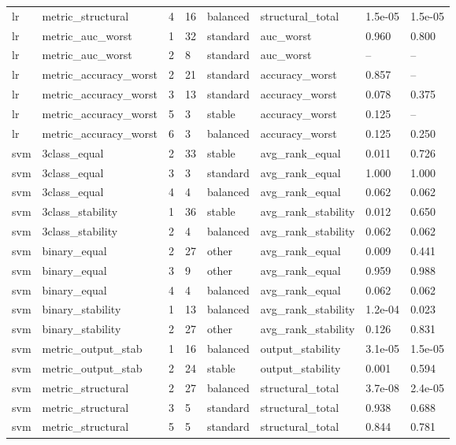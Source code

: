 \begin{table}
\begin{tabular}{llllllll}
lr & metric\_structural & 4 & 16 & balanced & structural\_total & 1.5e-05 & 1.5e-05 \\
lr & metric\_auc\_worst & 1 & 32 & standard & auc\_worst & 0.960 & 0.800 \\
lr & metric\_auc\_worst & 2 & 8 & standard & auc\_worst & -- & -- \\
lr & metric\_accuracy\_worst & 2 & 21 & standard & accuracy\_worst & 0.857 & -- \\
lr & metric\_accuracy\_worst & 3 & 13 & standard & accuracy\_worst & 0.078 & 0.375 \\
lr & metric\_accuracy\_worst & 5 & 3 & stable & accuracy\_worst & 0.125 & -- \\
lr & metric\_accuracy\_worst & 6 & 3 & balanced & accuracy\_worst & 0.125 & 0.250 \\
svm & 3class\_equal & 2 & 33 & stable & avg\_rank\_equal & 0.011 & 0.726 \\
svm & 3class\_equal & 3 & 3 & standard & avg\_rank\_equal & 1.000 & 1.000 \\
svm & 3class\_equal & 4 & 4 & balanced & avg\_rank\_equal & 0.062 & 0.062 \\
svm & 3class\_stability & 1 & 36 & stable & avg\_rank\_stability & 0.012 & 0.650 \\
svm & 3class\_stability & 2 & 4 & balanced & avg\_rank\_stability & 0.062 & 0.062 \\
svm & binary\_equal & 2 & 27 & other & avg\_rank\_equal & 0.009 & 0.441 \\
svm & binary\_equal & 3 & 9 & other & avg\_rank\_equal & 0.959 & 0.988 \\
svm & binary\_equal & 4 & 4 & balanced & avg\_rank\_equal & 0.062 & 0.062 \\
svm & binary\_stability & 1 & 13 & balanced & avg\_rank\_stability & 1.2e-04 & 0.023 \\
svm & binary\_stability & 2 & 27 & other & avg\_rank\_stability & 0.126 & 0.831 \\
svm & metric\_output\_stab & 1 & 16 & balanced & output\_stability & 3.1e-05 & 1.5e-05 \\
svm & metric\_output\_stab & 2 & 24 & stable & output\_stability & 0.001 & 0.594 \\
svm & metric\_structural & 2 & 27 & balanced & structural\_total & 3.7e-08 & 2.4e-05 \\
svm & metric\_structural & 3 & 5 & standard & structural\_total & 0.938 & 0.688 \\
svm & metric\_structural & 5 & 5 & standard & structural\_total & 0.844 & 0.781 \\

\end{tabular}
\end{table}
